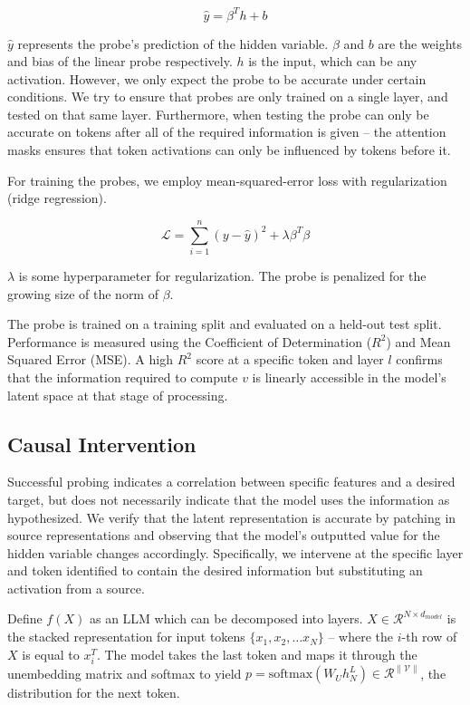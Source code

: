 \documentclass[11pt]{article}
\begin{document}
$$\hat{y} = \beta^T h + b$$

$\hat{y}$ represents the probe's prediction of the hidden variable. $\beta$ and $b$ are the weights and bias of the linear probe respectively. $h$ is the input, which can be any activation. However, we only expect the probe to be accurate under certain conditions. We try to ensure that probes are only trained on a single layer, and tested on that same layer. Furthermore, when testing the probe can only be accurate on tokens after all of the required information is given -- the attention masks ensures that token activations can only be influenced by tokens before it. 

For training the probes, we employ mean-squared-error loss with regularization (ridge regression). 

$$\mathcal{L} = \sum_{i=1}^n (y-\hat{y})^2 + \lambda \beta^T\beta$$

$\lambda$ is some hyperparameter for regularization. The probe is penalized for the growing size of the norm of $\beta$. 

The probe is trained on a training split and evaluated on a held-out test split. Performance is measured using the Coefficient of Determination ($R^2$) and Mean Squared Error (MSE). A high $R^2$ score at a specific token and layer $l$ confirms that the information required to compute $v$ is linearly accessible in the model's latent space at that stage of processing.

\subsection{Causal Intervention}
Successful probing indicates a correlation between specific features and a desired target, but does not necessarily indicate that the model uses the information as hypothesized. We verify that the latent representation is accurate by patching in source representations and observing that the model's outputted value for the hidden variable changes accordingly. Specifically, we intervene at the specific layer and token identified to contain the desired information but substituting an activation from a source. 

Define $f(X)$ as an LLM which can be decomposed into layers. $X \in \mathcal{R}^{N \times d_{model}}$ is the stacked representation for input tokens $\{x_1, x_2, \dots x_N\}$ -- where the $i$-th row of $X$ is equal to $x_i^T$. The model takes the last token and maps it through the unembedding matrix and softmax to yield $p = \text{softmax} (W_U h_N^L) \in \mathcal{R}^{\|\mathcal{V}\|}$, the distribution for the next token.  
\end{document}
